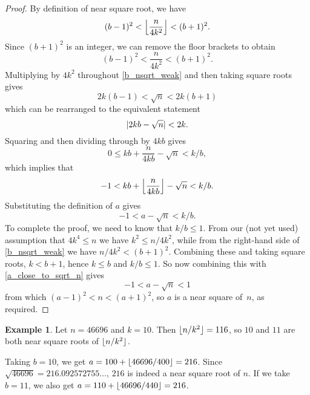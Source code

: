 \documentclass[a4paper]{article}
\DeclarePairedDelimiter\floor{\lfloor}{\rfloor}
\DeclarePairedDelimiter\abs{\lvert}{\rvert}
\theoremstyle{plain}
\theoremstyle{definition}
\newtheorem{example}[theorem]{Example}
\begin{document}
\begin{proof}
  By definition of near square root, we have
  \begin{equation}\label{b_nsqrt}
    (b - 1)^2 < \floor*{\frac{n}{4k^2}} < (b + 1)^2.
  \end{equation}
  Since $(b + 1)^2$ is an integer, we can remove the floor brackets to obtain
  \begin{equation}\label{b_nsqrt_weak}
    (b - 1)^2 < \frac{n}{4k^2} < (b + 1)^2.
  \end{equation}
  Multiplying by $4k^2$ throughout \eqref{b_nsqrt_weak} and then taking square
  roots gives
  \begin{equation}
    2k(b - 1) < \sqrt n < 2k(b + 1)
  \end{equation}
  which can be rearranged to the equivalent statement
  \begin{equation}
    \abs{2kb - \sqrt n} < 2k.
  \end{equation}
  Squaring and then dividing through by $4kb$ gives
  \begin{equation}
    0 \le kb + \frac{n}{4kb} - \sqrt n < k/b,
  \end{equation}
  which implies that
  \begin{equation}
    -1 < kb + \floor*{\frac{n}{4kb}} - \sqrt n < k/b.
  \end{equation}
  Substituting the definition of $a$ gives
  \begin{equation}\label{a_close_to_sqrt_n}
    -1 < a - \sqrt n < k/b.
  \end{equation}
  To complete the proof, we need to know that $k / b \le 1$. From our (not yet
  used) assumption that $4k^4 \le n$ we have $k^2 \le n / 4k^2$, while from the
  right-hand side of \eqref{b_nsqrt_weak} we have $n / 4k^2 < (b + 1)^2$.
  Combining these and taking square roots, $k < b + 1$, hence $k \le b $ and $k
  / b \le 1$. So now combining this with \eqref{a_close_to_sqrt_n} gives
  \begin{equation}
    -1 < a - \sqrt n < 1
  \end{equation}
  from which $(a - 1)^2 < n < (a + 1)^2$, so $a$ is a near square of~$n$, as
  required.
\end{proof}

\begin{example}
  Let $n = 46696$ and $k=10$. Then $\floor{n / k^2} = 116$, so $10$ and
  $11$ are both near square roots of $\floor{n / k^2}$.

  Taking $b = 10$, we get $a = 100 + \floor{46696 / 400} = 216$. Since
  $\sqrt{46696} = 216.092572755\dots$, $216$ is indeed a near square root of
  $n$. If we take $b = 11$, we also get $a = 110 + \floor{46696 / 440} = 216$.
\end{example}
\end{document}
